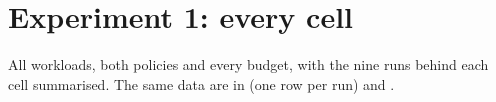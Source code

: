 \chapter{Experiment 1: every cell}
\label{app:full}
All workloads, both policies and every budget, with the nine runs behind each cell summarised. The same data are in  (one row per run) and .


